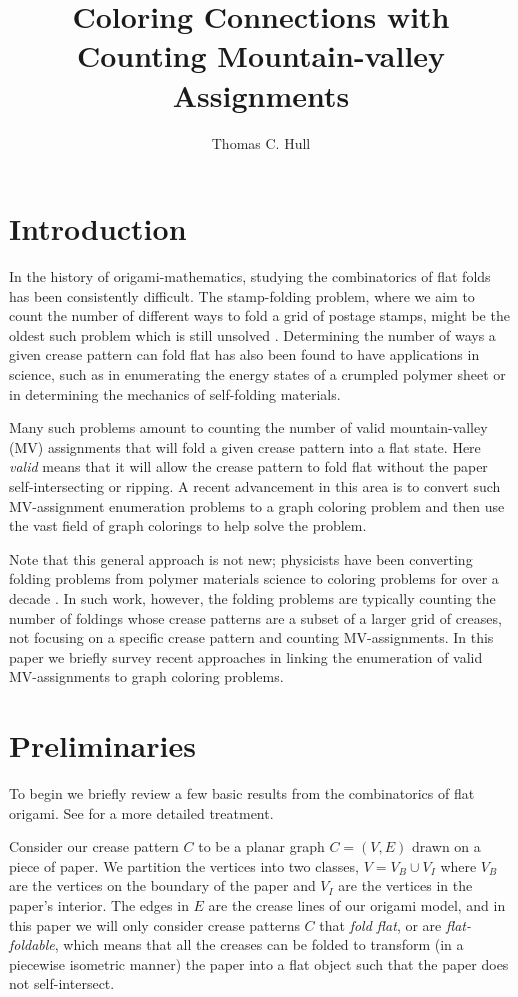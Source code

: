 \documentclass{amsart}
\title{Coloring Connections with Counting Mountain-valley Assignments}
\author[Hull]{Thomas C. Hull}
\theoremstyle{definition}
\begin{document}
\maketitle


\section{Introduction}



In the history of origami-mathematics, studying the combinatorics of flat folds has been consistently difficult.  The stamp-folding problem, where we aim to count the number of different ways to fold a grid of postage stamps, might be the oldest such problem which is still unsolved \cite{U}. Determining the number of ways a given crease pattern can fold flat has also been found to have applications in science, such as in enumerating the energy states of a crumpled polymer sheet or in determining the mechanics of self-folding materials.  

Many such problems amount to counting the number of valid mountain-valley (MV) assignments that will fold a given crease pattern into a flat state.  Here {\em valid} means that it will allow the crease pattern to fold flat without the paper self-intersecting or ripping.  A recent advancement in this area is to convert such MV-assignment enumeration problems to a graph coloring problem and then use the vast field of graph colorings to help solve the problem.  

Note that this general approach is not new;  physicists have been converting folding problems from polymer materials science to coloring problems for over a decade \cite{DiF}.  In such work, however, the folding problems are typically counting the number of foldings whose crease patterns are a subset of a larger grid of creases, not focusing on a specific crease pattern and counting MV-assignments.  In this paper we briefly survey recent approaches in linking the enumeration of valid MV-assignments to graph coloring problems.

\section{Preliminaries}

To begin we briefly review a few basic results from the combinatorics of flat origami.  See \cite{Hull2} for a more detailed treatment.

Consider our crease pattern $C$ to be a planar graph $C=(V,E)$ drawn on a piece of paper.  We partition the vertices into two classes, $V=V_B\cup V_I$ where $V_B$ are the vertices on the boundary of the paper and $V_I$ are the vertices in the paper's interior.  The edges in $E$ are the crease lines of our origami model, and in this paper we will only consider crease patterns $C$ that {\em fold flat}, or are {\em flat-foldable}, which means that all the creases can be folded to transform (in a piecewise isometric manner) the paper into a flat object such that the paper does not self-intersect.
\end{document}
